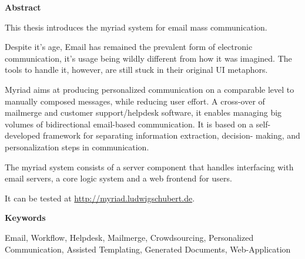 

\clearemptydoublepage
{}
{}


\vspace*{2cm}
\begin{center}
{\Large \bf Abstract}
\end{center}
\vspace{1cm}

This thesis introduces the myriad system for email mass communication.

Despite it's age, Email has remained the prevalent form of electronic communication, it's usage being wildly different from how it was imagined. The tools to handle it, however, are still stuck in their original UI metaphors.

Myriad aims at producing personalized communication on a comparable level to manually composed messages, while reducing user effort.
A cross-over of mailmerge and customer support/helpdesk software, it enables managing big volumes of bidirectional email-based communication.
It is based on a self-developed framework for separating information extraction, decision- making, and personalization steps in communication.

The myriad system consists of a server component that handles interfacing with email servers, a core logic system and a web frontend for users.

It can be tested at \url{http://myriad.ludwigschubert.de}.

\vspace*{2cm}
\begin{center}
{\Large \bf Keywords}
\end{center}
\vspace{1cm}

Email, Workflow, Helpdesk, Mailmerge, Crowdsourcing, Personalized Communication, Assisted Templating, Generated Documents, Web-Application